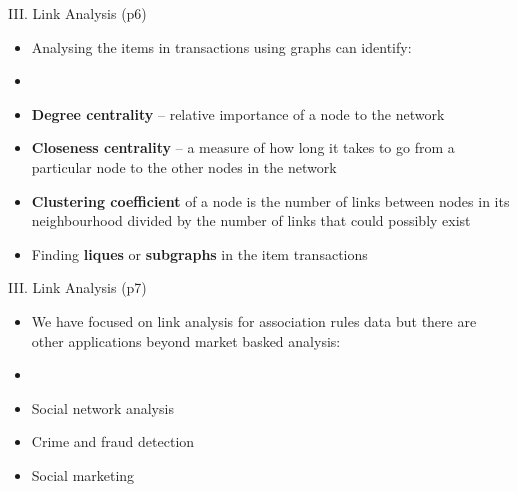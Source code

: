 \documentclass[handout]{beamer}
\newcommand{\strong}[1]{\textbf{\color{teal} #1}}
\begin{document}
\begin{frame}{III. Link Analysis (p6)}
\begin{itemize}
\item[] Analysing the items in transactions using graphs can identify:
\item[]
\item \strong{Degree centrality} -- relative importance of a node to the network
\item \strong{Closeness centrality} -- a measure of how long it takes to go from a particular node to the other nodes in the network
\item \strong{Clustering coefficient} of a node is the number of links between nodes in its neighbourhood divided by the number of links that could possibly exist
\item Finding \strong{liques} or \strong{subgraphs} in the item transactions
\end{itemize}
\end{frame}
\begin{frame}{III. Link Analysis (p7)}
\begin{itemize}
\item[] We have focused on link analysis for association rules data but there are other applications beyond market basked analysis:
\item[]
\item Social network analysis
\item Crime and fraud detection
\item Social marketing
\end{itemize}
\end{frame}


\end{document}
